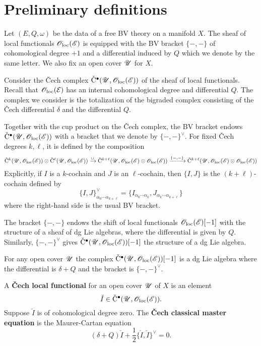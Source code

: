 \documentclass[11pt]{amsart}
\numberwithin{equation}{section}
\def\vC{{\rm\check{C}}}
\def\vI{\check{I}}
\begin{document}
\section{Preliminary definitions}

Let $(E, Q, \omega)$ be the data of a free BV theory on a manifold $X$.
The sheaf of local functionals ${\mathscr O}_{\rm loc}(\mathscr E)$ is equipped with the BV bracket $\{-,-\}$ of cohomological degree $+1$ and a differential induced by $Q$ which we denote by the same letter.
We also fix an open cover $\mathscr U$ for $X$. 

Consider the \v{C}ech complex $\vC^\bu(\sU, \oloc(\sE))$ of the sheaf of local functionals. 
Recall that ${\mathscr O}_{\rm loc}(\mathcal E)$ has an internal cohomological degree and differential $Q$. 
The complex we consider is the totalization of the bigraded complex consisting of the \v{C}ech differential $\delta$ and the differential $Q$. 

Together with the cup product on the \v{C}ech complex, the BV bracket endows $\vC^\bu(\sU, \oloc(\sE))$
with a bracket that we denote by $\{-,-\}^{\vee}$. 
For fixed \v{C}ech degrees $k, \ell$, it is defined by the composition
\[
\vC^k(\sU, \oloc(\sE)) \otimes \vC^\ell (\sU, \oloc(\sE)) \xto{\cup} \vC^{k + \ell} (\sU, \oloc(\sE) \otimes \oloc(\sE)) \xto{\{-,-\}} \vC^{k + \ell} (\sU, \oloc(\sE) \otimes \oloc(\sE))
\]
Explicitly, if $I$ is a $k$-cochain and $J$ is an $\ell$-cochain, then $\{I,J\}$ is the $(k+\ell)$-cochain defined by
\[
\{I,J\}^\vee_{\alpha_0 \cdots \alpha_{k+\ell}} = \{I_{\alpha_0 \cdots \alpha_k}, J_{\alpha_k \cdots \alpha_{k + \ell}}\}
\]
where the right-hand side is the usual BV bracket.

The bracket $\{-,-\}$ endows the shift of local functionals ${\mathscr O}_{\rm loc} (\mathscr E)[-1]$ with the structure of a sheaf of dg Lie algebras, where the differential is given by $Q$. 
Similarly, $\{-,-\}^{\vee}$ gives $\vC^\bu(\sU, \oloc(\sE))[-1]$ the structure of a dg Lie algebra.

\begin{lem}
For any open cover $\mathscr U$ the complex $\vC^\bu(\sU, \oloc(\sE))[-1]$ is a dg Lie algebra where the differential is $\delta + Q$ and the bracket is $\{-,-\}^\vee$. 
\end{lem}

\begin{dfn}
A {\bf \v{C}ech local functional} for an open cover $\mathscr U$ of $X$ is an element 
\[
\vI \in \vC^\bu (\sU , \oloc(\sE)) .
\]
Suppose $\vI$ is of cohomological degree zero.
The {\bf \v{C}ech classical master equation} is the Maurer-Cartan equation
\[
(\delta + Q) \vI + \frac{1}{2} \{\vI,\vI\}^{\vee} = 0 .
\] 
\end{dfn}
\end{document}
